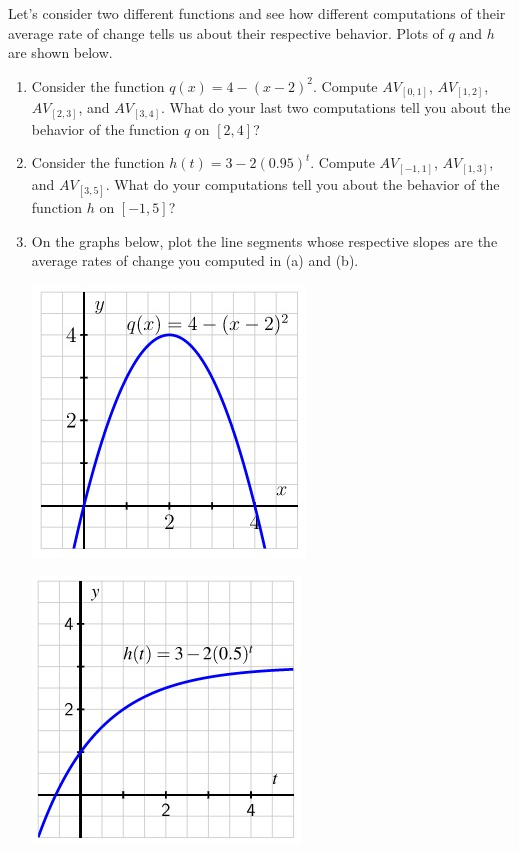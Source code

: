 \documentclass[nooutcomes]{ximera}
\begin{document}
\begin{exploration}
Let's consider two different functions and see how different computations of their average rate of change tells us about their respective behavior. Plots of $q$  and $h$ are shown below.

\begin{enumerate}[label=\alph*.]
\item Consider the function \(q(x) = 4-(x-2)^2\). Compute \(AV_{[0,1]}\), \(AV_{[1,2]}\), \(AV_{[2,3]}\), and \(AV_{[3,4]}\). What do your last two computations tell you about the behavior of the function \(q\) on \([2,4]\)?


\item Consider the function \(h(t) = 3 - 2(0.95)^t\). Compute \(AV_{[-1,1]}\), \(AV_{[1,3]}\), and \(AV_{[3,5]}\). What do your computations tell you about the behavior of the function \(h\) on \([-1,5]\)?

\item On the graphs below, plot the line segments whose respective slopes are the average rates of change you computed in (a) and (b).

\begin{image}
\includegraphics{ARoCtext4.jpg}
\end{image}

\begin{image}
\includegraphics{ARoCtext5.jpg}
\end{image}


\end{enumerate}
\end{exploration}
\end{document}
